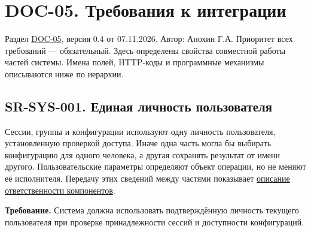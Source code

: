 \documentclass[12pt,a4paper]{article}
\begin{document}
\section{DOC-05. Требования к интеграции}\label{doc-05-ux442ux440ux435ux431ux43eux432ux430ux43dux438ux44f-ux43a-ux438ux43dux442ux435ux433ux440ux430ux446ux438ux438}

\hypertarget{doc-05-требования-к-интеграции}{}

Раздел \hyperref[doc-05-ux441ux438ux441ux442ux435ux43cux43dux44bux435-ux442ux440ux435ux431ux43eux432ux430ux43dux438ux44f]{DOC-05}, версия 0.4 от 07.11.2026. Автор: Анохин Г.А. Приоритет всех требований --- обязательный. Здесь определены свойства совместной работы частей системы. Имена полей, HTTP-коды и программные механизмы описываются ниже по иерархии.

\subsection{SR-SYS-001. Единая личность пользователя}\label{sr-sys-001-ux435ux434ux438ux43dux430ux44f-ux43bux438ux447ux43dux43eux441ux442ux44c-ux43fux43eux43bux44cux437ux43eux432ux430ux442ux435ux43bux44f}

\hypertarget{sr-sys-001-единая-личность-пользователя}{}

Сессии, группы и конфигурации используют одну личность пользователя, установленную проверкой доступа. Иначе одна часть могла бы выбирать конфигурацию для одного человека, а другая сохранять результат от имени другого. Пользовательские параметры определяют объект операции, но не меняют её исполнителя. Передачу этих сведений между частями показывает \href{../07_\%D0\%9F\%D1\%80\%D0\%BE\%D0\%B3\%D1\%80\%D0\%B0\%D0\%BC\%D0\%BC\%D0\%BD\%D1\%8B\%D0\%B5_\%D1\%82\%D1\%80\%D0\%B5\%D0\%B1\%D0\%BE\%D0\%B2\%D0\%B0\%D0\%BD\%D0\%B8\%D1\%8F/DOC-06_\%D0\%9F\%D1\%80\%D0\%BE\%D0\%B3\%D1\%80\%D0\%B0\%D0\%BC\%D0\%BC\%D0\%BD\%D1\%8B\%D0\%B5_\%D1\%82\%D1\%80\%D0\%B5\%D0\%B1\%D0\%BE\%D0\%B2\%D0\%B0\%D0\%BD\%D0\%B8\%D1\%8F.pdf\#nameddest=2-\%D0\%BE\%D1\%82\%D0\%B2\%D0\%B5\%D1\%82\%D1\%81\%D1\%82\%D0\%B2\%D0\%B5\%D0\%BD\%D0\%BD\%D0\%BE\%D1\%81\%D1\%82\%D1\%8C-\%D0\%B8-\%D1\%81\%D0\%B2\%D1\%8F\%D0\%B7\%D0\%B8}{описание ответственности компонентов}.

\textbf{Требование.} Система должна использовать подтверждённую личность текущего пользователя при проверке принадлежности сессий и доступности конфигураций.
\end{document}
